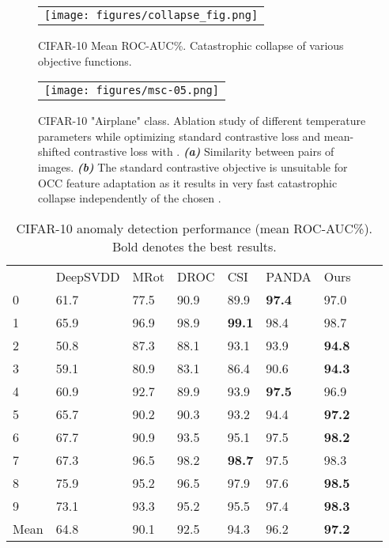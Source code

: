 \documentclass[letterpaper]{article} \usepackage{aaai23}  \usepackage{times}  \usepackage{helvet}  \usepackage{courier}  \usepackage[hyphens]{url}  \usepackage{graphicx} \usepackage{amsmath, amssymb}
\begin{document}
\begin{figure*}[ht]

  \centering
    \begin{tabular}{c}
\texttt{[image: figures/collapse\_fig.png]}
    \end{tabular}
    \caption{CIFAR-10 Mean ROC-AUC\%. Catastrophic collapse of various objective functions.}      \label{appendix:fig}
\end{figure*}

\begin{figure*}[ht]
  \centering
    \begin{tabular}{c}
\texttt{[image: figures/msc-05.png]}
    \end{tabular}
    \caption{CIFAR-10 "Airplane" class. Ablation study of different temperature parameters while optimizing standard contrastive loss and mean-shifted contrastive loss with . \textbf{\textit{(a)}} Similarity between pairs of images. \textbf{\textit{(b)}} The standard contrastive objective is unsuitable for OCC feature adaptation as it results in very fast catastrophic collapse independently of the chosen .}
    \label{appendix:temp_fig}

\end{figure*}

\begin{table*}[ht]
  \centering
  \begin{tabular}{lllllllll}
    \toprule
&	DeepSVDD 	&	MRot 	&	DROC 	&	CSI 	&	PANDA 	&	Ours	\\

    \cmidrule(r){1-1}
    \cmidrule(r){2-7}

0	&	61.7	&	77.5	&	90.9	&	89.9	&	\textbf{97.4}	&	97.0	\\
1	&	65.9	&	96.9	&	98.9	&	\textbf{99.1}	&	98.4	&	98.7	\\
2	&	50.8	&	87.3	&	88.1	&	93.1	&	93.9	&	\textbf{94.8}	\\
3	&	59.1	&	80.9	&	83.1	&	86.4	&	90.6	&	\textbf{94.3}	\\
4	&	60.9	&	92.7	&	89.9	&	93.9	&	\textbf{97.5}	&	96.9	\\
5	&	65.7	&	90.2	&	90.3	&	93.2	&	94.4	&	\textbf{97.2}	\\
6	&	67.7	&	90.9	&	93.5	&	95.1	&	97.5	&	\textbf{98.2}	\\
7	&	67.3	&	96.5	&	98.2	&	\textbf{98.7}	&	97.5	&	98.3	\\
8	&	75.9	&	95.2	&	96.5	&	97.9	&	97.6	&	\textbf{98.5}	\\
9	&	73.1	&	93.3	&	95.2	&	95.5	&	97.4	&	\textbf{98.3}	\\
						
    \cmidrule(r){1-1}
    \cmidrule(r){2-7}

Mean	&	64.8	&	90.1	&	92.5	&	94.3	&	96.2	&	\textbf{97.2}	\\	

    \bottomrule
  \end{tabular}
\caption{CIFAR-10 anomaly detection performance (mean ROC-AUC\%). Bold denotes the best results.}
\label{tab:cifar-10}
\end{table*}
\end{document}
